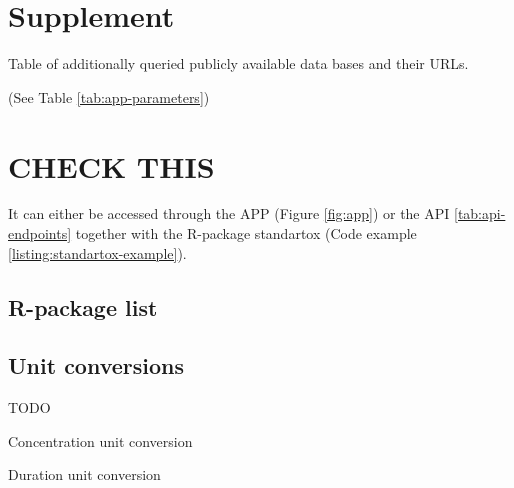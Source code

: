 \section*{Supplement}

\begin{table}
    \label{tab:endpoints-conflate}
    
\end{table}

\begin{table}[ht]
    \label{tab:data-base-additional}
    \caption{Table of additionally queried publicly available data bases and their URLs.}
    
\end{table}

(See Table \ref{tab:app-parameters})


\pagebreak
\section{CHECK THIS}

It can either be accessed through the APP (Figure \ref{fig:app}) or the API \ref{tab:api-endpoints} together with the R-package standartox (Code example \ref{listing:standartox-example}). 


\subsection*{R-package list}
\label{list:r-packages}


\subsection*{Unit conversions}
 TODO
\begin{table}
    \caption{Concentration unit conversion}
    \label{sup:conv-concentration}
\end{table}


\begin{table}
    \caption{Duration unit conversion}
    \label{sup:conv-duration}
\end{table}

%

